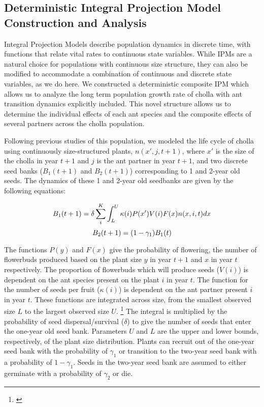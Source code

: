 \documentclass[11pt]{article}
\newcommand{\ali}[2]{{\color{pink}{#1}}\footnote{\textit{\color{pink}{#2}}}}
\begin{document}
\subsection*{Deterministic Integral Projection Model Construction and Analysis}
  
Integral Projection Models describe population dynamics in discrete time, with functions that relate vital rates to continuous state variables. 
While IPMs are a natural choice for populations with continuous size structure, they can also be modified to accommodate a combination of continuous and discrete state variables, as we do here. 
We constructed a deterministic composite IPM which allows us to analyze the long term population growth rate of cholla with ant transition dynamics explicitly included.
This novel structure allows us to determine the individual effects of each ant species and the composite effects of several partners across the cholla population. 

Following previous studies of this population, we modeled the life cycle of cholla using continuously size-structured plants, $n(x',j,t+1)$, where $x'$ is the size of the cholla in year $t+1$ and $j$ is the ant partner in year $t+1$, and two discrete seed banks ($B_{1}(t+1)$ and $B_{2}(t+1)$) corresponding to 1 and 2-year old seeds.
The dynamics of these 1 and 2-year old seedbanks are given by the following equations:

  \begin{linenomath*}
		$$
		B_1(t+1) = \delta \sum_{i}^{K} \int_L^U  \kappa(i) P(x') V(i) F(x) n(x,i,t) dx \\
		$$
		$$
		B_2(t+1) =  (1 - \gamma_1)B_1(t)\\
		$$
  \end{linenomath*}

The functions $P(y)$ and $F(x)$ give the probability of flowering, the number of flowerbuds produced based on the plant size $y$ in year $t+1$ and $x$ in year $t$ respectively. 
The proportion of flowerbuds which will produce seeds ($V(i)$) is dependent on the ant species present on the plant $i$ in year $t$. 
The function for the number of seeds per fruit ($\kappa(i)$)  is dependent on the ant partner present $i$ in year $t$.
These functions are integrated across size, from the smallest observed size $L$ to the largest observed size $U$. \ali{}{I know that technically L is smaller than the smallest size and U is larger, but I am not sure if here is the place to put it. }
The integral is multiplied by the probability of seed dispersal/survival ($\delta$) to give the number of seeds that enter the one-year old seed bank. 
Parameters $U$ and $L$ are the upper and lower bounds, respectively, of the plant size distribution. 
Plants can recruit out of the one-year seed bank with the probability of $\gamma_1$ or transition to the two-year seed bank with a probability of $1 - \gamma_1$. 
Seeds in the two-year seed bank are assumed to either germinate with a probability of $\gamma_2$ or die. 
		
\end{document}
